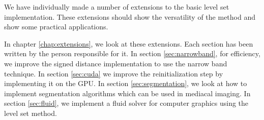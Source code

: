 We have individually made a number of extensions to the basic level
set implementation. These extensions should show the versatility of
the method and show some practical applications.

In chapter \vref{chap:extensions}, we look at these extensions. Each
section has been written by the person responsible for it.
In section \vref{sec:narrowband}, for efficiency, we improve the
signed distance implementation to use the narrow band technique. 
In section \vref{sec:cuda} we improve the reinitialization step by
implementing it on the GPU.
In section \vref{sec:segmentation}, we look at how to implement
segmentation algorithms which can be used in mediacal imaging. 
In section \vref{sec:fluid}, we implement a fluid solver for computer
graphics using the level set method. 




